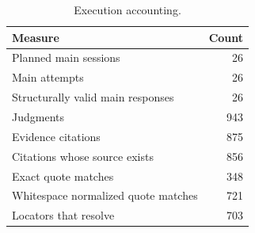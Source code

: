 \begin{table}[t]
\caption{Execution accounting.}
\label{tab:execution}
\centering\begin{tabular}{lr}\toprule
Measure & Count \\
\midrule
Planned main sessions & 26 \\
Main attempts & 26 \\
Structurally valid main responses & 26 \\
Judgments & 943 \\
Evidence citations & 875 \\
Citations whose source exists & 856 \\
Exact quote matches & 348 \\
Whitespace normalized quote matches & 721 \\
Locators that resolve & 703 \\
\bottomrule\end{tabular}
\end{table}
